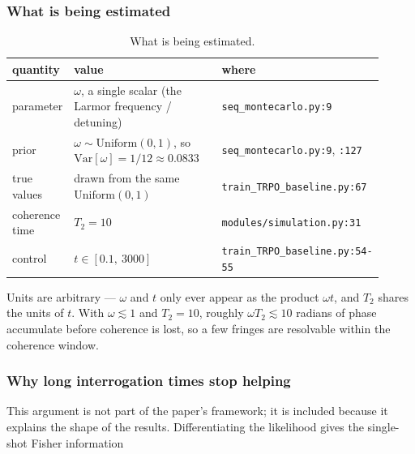 \documentclass[12pt,a4paper]{article}
\begin{document}
\subsubsection{What is being estimated}\label{sec:what-is-being-estimated}
\begin{table}[H]
  \centering
  \caption{What is being estimated.}
  \label{tab:what-is-being-estimated}
  \footnotesize
  \begin{tabular}{>{\raggedright\arraybackslash}p{0.124\linewidth}>{\raggedright\arraybackslash}p{0.438\linewidth}>{\raggedright\arraybackslash}p{0.344\linewidth}}
  \toprule
  quantity & value & where \\
  \midrule
  parameter & $\omega$, a single scalar (the Larmor frequency / detuning) & \texttt{seq\_\allowbreak{}montecarlo.\allowbreak{}py:\allowbreak{}9} \\
  prior & $\omega \sim \mathrm{Uniform}(0, 1)$, so $\mathrm{Var}[\omega] = 1/12 \approx 0.0833$ & \texttt{seq\_\allowbreak{}montecarlo.\allowbreak{}py:\allowbreak{}9}, \texttt{:\allowbreak{}127} \\
  true values & drawn from the same $\mathrm{Uniform}(0,1)$ & \texttt{train\_\allowbreak{}TRPO\_\allowbreak{}baseline.\allowbreak{}py:\allowbreak{}67} \\
  coherence time & $T_2 = 10$ & \texttt{modules/\allowbreak{}simulation.\allowbreak{}py:\allowbreak{}31} \\
  control & $t \in [0.1,\ 3000]$ & \texttt{train\_\allowbreak{}TRPO\_\allowbreak{}baseline.\allowbreak{}py:\allowbreak{}54-\allowbreak{}55} \\
  \bottomrule
  \end{tabular}
\end{table}
Units are arbitrary --- $\omega$ and $t$ only ever appear as the product $\omega t$, and $T_2$ shares the units of $t$. With $\omega \lesssim 1$ and $T_2 = 10$, roughly $\omega T_2 \lesssim 10$ radians of phase accumulate before coherence is lost, so a few fringes are resolvable within the coherence window.

\subsubsection{Why long interrogation times stop helping}\label{sec:aside-why-long-interrogation-times-stop-helping}
This argument is not part of the paper's framework; it is included because it explains the shape of the results. Differentiating the likelihood gives the single-shot Fisher information
\end{document}

